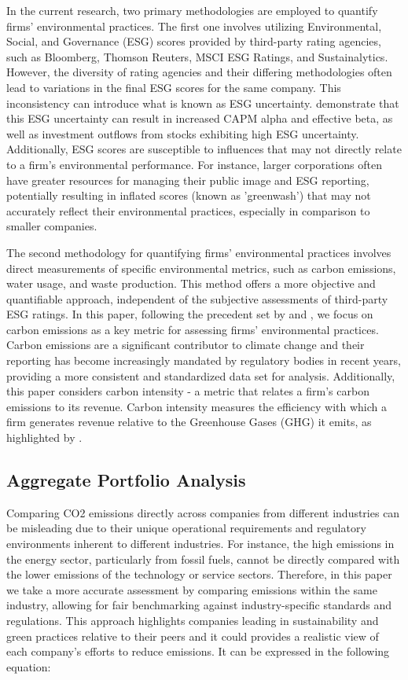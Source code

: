\documentclass[12pt]{article}
\begin{document}
In the current research, two primary methodologies are employed to quantify firms' environmental practices. The first one involves utilizing Environmental, Social, and Governance (ESG) scores provided by third-party rating agencies, such as Bloomberg, Thomson Reuters, MSCI ESG Ratings, and Sustainalytics. However, the diversity of rating agencies and their differing methodologies often lead to variations in the final ESG scores for the same company. This inconsistency can introduce what is known as ESG uncertainty. \cite{avramov2022sustainable} demonstrate that this ESG uncertainty can result in increased CAPM alpha and effective beta, as well as investment outflows from stocks exhibiting high ESG uncertainty. Additionally, ESG scores are susceptible to influences that may not directly relate to a firm's environmental performance. For instance, larger corporations often have greater resources for managing their public image and ESG reporting, potentially resulting in inflated scores (known as 'greenwash') that may not accurately reflect their environmental practices, especially in comparison to smaller companies.

The second methodology for quantifying firms' environmental practices involves direct measurements of specific environmental metrics, such as carbon emissions, water usage, and waste production. This method offers a more objective and quantifiable approach, independent of the subjective assessments of third-party ESG ratings. In this paper, following the precedent set by \cite{bolton2021investors} and \cite{ardia2022climate}, we focus on carbon emissions as a key metric for assessing firms' environmental practices. Carbon emissions are a significant contributor to climate change and their reporting has become increasingly mandated by regulatory bodies in recent years, providing a more consistent and standardized data set for analysis. Additionally, this paper considers carbon intensity - a metric that relates a firm's carbon emissions to its revenue. Carbon intensity measures the efficiency with which a firm generates revenue relative to the Greenhouse Gases (GHG) it emits, as highlighted by \cite{ilhan2021carbon}. 

\subsection{Aggregate Portfolio Analysis}
Comparing CO2 emissions directly across companies from different industries can be misleading due to their unique operational requirements and regulatory environments inherent to different industries. For instance, the high emissions in the energy sector, particularly from fossil fuels, cannot be directly compared with the lower emissions of the technology or service sectors. Therefore, in this paper we take a more accurate assessment by comparing emissions within the same industry, allowing for fair benchmarking against industry-specific standards and regulations. This approach highlights companies leading in sustainability and green practices relative to their peers and it could provides a realistic view of each company's efforts to reduce emissions. It can be expressed in the following equation:
\end{document}
